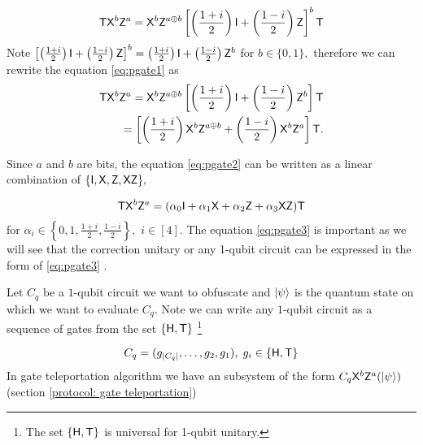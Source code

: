 \begin{equation}
\label{eq:pgate1}
{\sf T} {\sf X}^b {\sf Z}^a={\sf X}^b {\sf Z}^{a\oplus b}\left[\left(\frac{1+i}{2}\right) {\sf I} + \left(\frac{1-i}{2}\right){\sf Z}\right]^b {\sf T}
\end{equation}
Note  $\left[\left(\frac{1+i}{2}\right) {\sf I} + \left(\frac{1-i}{2}\right){\sf Z}\right]^b=\left(\frac{1+i}{2}\right) {\sf I} + \left(\frac{1-i}{2}\right){\sf Z}^b$ for $b \in \{0,1\},$ therefore we can rewrite the equation \ref{eq:pgate1} as
\begin{equation}
\label{eq:pgate2}
\begin{aligned}
{\sf T} {\sf X}^b {\sf Z}^a={\sf X}^b {\sf Z}^{a\oplus b}\left[\left(\frac{1+i}{2}\right) {\sf I} + \left(\frac{1-i}{2}\right){\sf Z}^b\right] {\sf T} \\
=\left[\left(\frac{1+i}{2}\right) {\sf X}^b {\sf Z}^{a\oplus b} + \left(\frac{1-i}{2}\right){\sf X}^b {\sf Z}^a\right] {\sf T}. \\
\end{aligned}
\end{equation}

Since $a$ and $b$ are bits, the equation \ref{eq:pgate2} can be written as a linear combination of $\{{\sf I}, {\sf X}, {\sf Z}, {\sf X} {\sf Z}\},$

\begin{equation}
\label{eq:pgate3}
\begin{aligned}
{\sf T} {\sf X}^b {\sf Z}^a= (\alpha_0 {\sf I} +  \alpha_1 {\sf X} + \alpha_2 {\sf Z} + \alpha_3 {\sf X}{\sf Z}){\sf T} \\
\end{aligned}
\end{equation}
for   $\alpha_i \in\left\{0,1, \frac{1+i}{2}, \frac{1-i}{2}\right\},$  $i\in[4].$ The equation \ref{eq:pgate3} is important as we will see that the correction unitary or any 1-qubit circuit can be expressed in the form of \ref{eq:pgate3} .


Let $C_q$ be a $1$-qubit circuit we want to obfuscate and ${\lvert}\psi\rangle$ is the quantum state on which we want to evaluate $C_q.$ Note we can write any $1$-qubit circuit as a sequence of gates from the set $\{{\sf H}, {\sf T}\}$ \footnote{The set $\{{\sf H},  {\sf T}\}$ is universal for 1-qubit unitary.}

$$C_q=(g_{|C_q|},\ldots,g_2,g_1 ),\; g_i\in\{{\sf H}, {\sf T}\}$$
In gate teleportation algorithm we have an subsystem of the form $C_q {\sf X}^b{\sf Z}^a ({\lvert}\psi\rangle)$ (section \ref{protocol: gate  teleportation}) 

